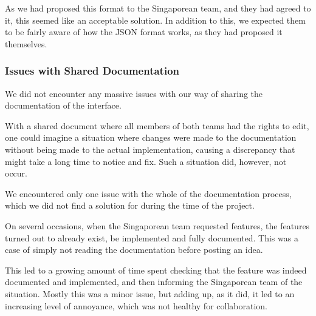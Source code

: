 As we had proposed this format to the Singaporean team, and they had agreed to it, this seemed like an
acceptable solution. In addition to this, we expected them to be fairly aware of how the JSON format works,
as they had proposed it themselves.

\subsubsection{Issues with Shared Documentation}

We did not encounter any massive issues with our way of sharing the documentation of the interface.

With a shared document where all members of both teams had the rights to edit, one could imagine a situation
where changes were made to the documentation without being made to the actual implementation, causing a
discrepancy that might take a long time to notice and fix. Such a situation did, however, not occur.

We encountered only one issue with the whole of the documentation process, which we did not find a solution for
during the time of the project.

On several occasions, when the Singaporean team requested features, the features turned out to already exist, be
implemented and fully documented. This was a case of simply not reading the documentation before posting an idea.

This led to a growing amount of time spent checking that the feature was indeed documented and implemented, and then
informing the Singaporean team of the situation. Mostly this was a minor issue, but adding up, as it did, it led to
an increasing level of annoyance, which was not healthy for collaboration.